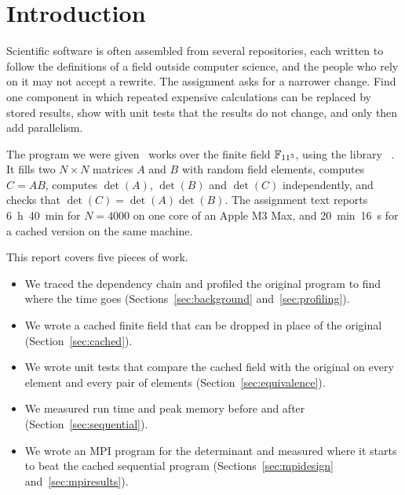 \section{Introduction}
\label{sec:introduction}

Scientific software is often assembled from several repositories, each written to follow the
definitions of a field outside computer science, and the people who rely on it may not accept
a rewrite. The assignment asks for a narrower change. Find one component in which repeated
expensive calculations can be replaced by stored results, show with unit tests that the
results do not change, and only then add parallelism.

The program we were given~\cite{russell2026assignment} works over the finite field $\mathbb{F}_{11^3}$,
using the library ~\cite{russell2026fields}. It fills two $N \times N$
matrices $A$ and $B$ with random field elements, computes $C = AB$, computes $\det(A)$,
$\det(B)$ and $\det(C)$ independently, and checks that $\det(C) = \det(A)\det(B)$. The
assignment text reports 6~h~40~min for $N = 4000$ on one core of an Apple M3 Max, and
20~min~16~s for a cached version on the same machine.

This report covers five pieces of work.
\begin{itemize}
  \item We traced the dependency chain and profiled the original program to find where the
        time goes (Sections~\ref{sec:background} and~\ref{sec:profiling}).
  \item We wrote a cached finite field that can be dropped in place of the original
        (Section~\ref{sec:cached}).
  \item We wrote unit tests that compare the cached field with the original on every
        element and every pair of elements (Section~\ref{sec:equivalence}).
  \item We measured run time and peak memory before and after
        (Section~\ref{sec:sequential}).
  \item We wrote an MPI program for the determinant and measured where it starts to beat the
        cached sequential program (Sections~\ref{sec:mpidesign} and~\ref{sec:mpiresults}).
\end{itemize}
